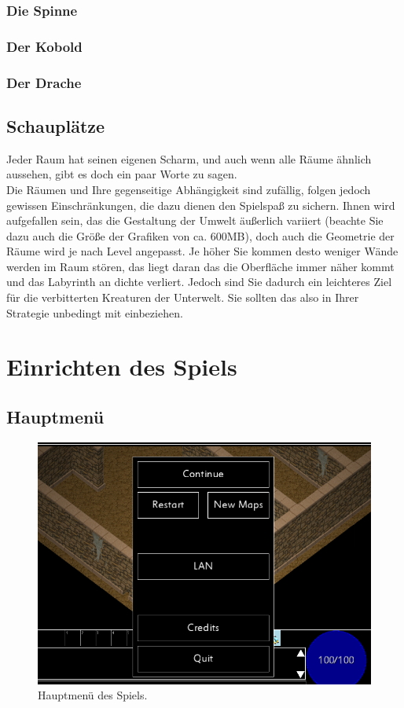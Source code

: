 \documentclass[12pt, a4paper]{scrreprt}
\begin{document}
\subsection*{Die Spinne}
\subsection*{Der Kobold}
\subsection*{Der Drache}
\section{Schauplätze}
Jeder Raum hat seinen eigenen Scharm, und auch wenn alle Räume ähnlich aussehen, gibt es doch ein paar Worte zu sagen.\\
Die Räumen und Ihre gegenseitige Abhängigkeit sind zufällig, folgen jedoch gewissen Einschränkungen, die dazu dienen den Spielspaß zu sichern. Ihnen wird aufgefallen sein, das die Gestaltung der Umwelt äußerlich variiert (beachte Sie dazu auch die Größe der Grafiken von ca. 600MB), doch auch die Geometrie der Räume wird je nach Level angepasst. Je höher Sie kommen desto weniger Wände werden im Raum stören, das liegt daran das die Oberfläche immer näher kommt und das Labyrinth an dichte verliert. Jedoch sind Sie dadurch ein leichteres Ziel für die verbitterten Kreaturen der Unterwelt. Sie sollten das also in Ihrer Strategie unbedingt mit einbeziehen.
\chapter{Einrichten des Spiels}
\section{Hauptmenü}
\begin{figure}[h]
\includegraphics[width=\textwidth]{img/menu}
\caption{Hauptmenü des Spiels.}
\end{figure}
\end{document}
